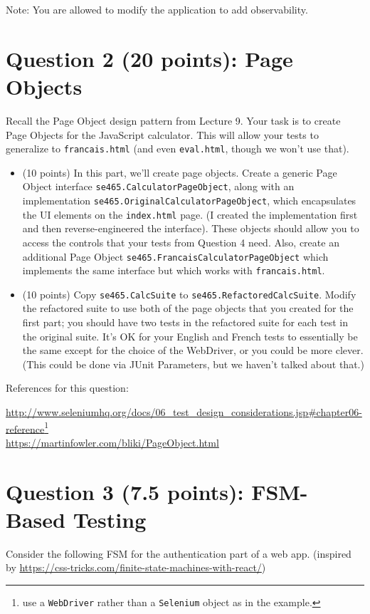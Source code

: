 \documentclass[10pt,hidelinks]{article}
\begin{document}
Note: You are allowed to modify the application to add observability.


\section*{Question 2 (20 points): Page Objects}

Recall the Page Object design pattern from Lecture 9. Your task is to create Page Objects for the JavaScript calculator. This will allow your tests to generalize to {\tt francais.html} (and even
{\tt eval.html}, though we won't use that).

\begin{itemize}
\item (10 points) In this part, we'll create page objects. Create a generic Page Object interface {\tt se465.CalculatorPageObject}, along with an implementation {\tt se465.OriginalCalculatorPageObject}, which encapsulates the UI elements on the {\tt index.html} page. (I created the implementation first and then reverse-engineered the interface). These objects should allow you to access the controls that your tests from Question 4 need. Also, create an additional Page Object {\tt se465.FrancaisCalculatorPageObject} which implements the same interface but which works with {\tt francais.html}. 
  \item (10 points) Copy {\tt se465.CalcSuite} to {\tt se465.RefactoredCalcSuite}. Modify the refactored suite to use both of the page objects that you created for the first part; you should have two tests in the refactored suite for each test in the original suite. It's OK for your English and French tests to essentially be the same except for the choice of the WebDriver, or you could be more clever. (This could be done via JUnit Parameters, but we haven't talked about that.)
\end{itemize}

References for this question:

\url{http://www.seleniumhq.org/docs/06_test_design_considerations.jsp#chapter06-reference}\footnote{use a {\tt WebDriver} rather than a {\tt Selenium} object as in the example.}
\\
\url{https://martinfowler.com/bliki/PageObject.html}

\section*{Question 3 (7.5 points): FSM-Based Testing}
Consider the following FSM for the authentication part of a web app.
(inspired by \url{https://css-tricks.com/finite-state-machines-with-react/})
\end{document}
